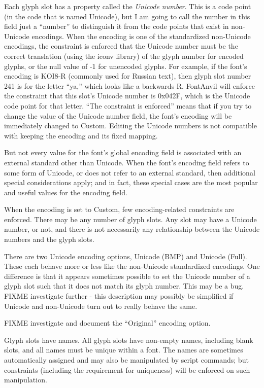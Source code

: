 \documentclass[11pt]{report}
\begin{document}
Each glyph slot has a property called the \emph{Unicode number}.  This is a
code point (in the code that is named Unicode), but I am going to call the
number in this field just a ``number'' to distinguish it from the code
points that exist in non-Unicode encodings.  When the encoding is one of the
standardized non-Unicode encodings, the constraint is enforced that the
Unicode number must be the correct translation (using the iconv library) of
the glyph number for encoded glyphs, or the null value of -1 for unencoded
glyphs.  For example, if the font's encoding is KOI8-R (commonly used for
Russian text), then glyph slot number 241 is for the letter ``ya,'' which
looks like a backwards R.  FontAnvil will enforce the constraint that this
slot's Unicode number is 0x042F, which is the Unicode code point for that
letter.  ``The constraint is enforced'' means that if you try to change the
value of the Unicode number field, the font's encoding will be immediately
changed to Custom.  Editing the Unicode numbers is not compatible with
keeping the encoding and its fixed mapping.

But not every value for the font's global encoding field is associated with
an external standard other than Unicode.  When the font's encoding field
refers to some form of Unicode, or does not refer to an external standard,
then additional special considerations apply; and in fact, these special
cases are the most popular and useful values for the encoding field.

When the encoding is set to Custom, few encoding-related constraints are
enforced.  There may be any number of glyph slots.  Any slot may have a
Unicode number, or not, and there is not necessarily any relationship
between the Unicode numbers and the glyph slots.

There are two Unicode encoding options, Unicode (BMP) and Unicode (Full). 
These each behave more or less like the non-Unicode standardized encodings. 
One difference is that it appears sometimes possible to set the Unicode
number of a glyph slot such that it does not match its glyph number.  This
may be a bug.  FIXME investigate further - this description may possibly be
simplified if Unicode and non-Unicode turn out to really behave the same.

FIXME investigate and document the ``Original'' encoding option.

Glyph slots have names.  All glyph slots have non-empty names, including
blank slots, and all names must be unique within a font.  The names are
sometimes automatically assigned and may also be manipulated by script
commands; but constraints (including the requirement for uniqueness) will be
enforced on such manipulation.
\end{document}
